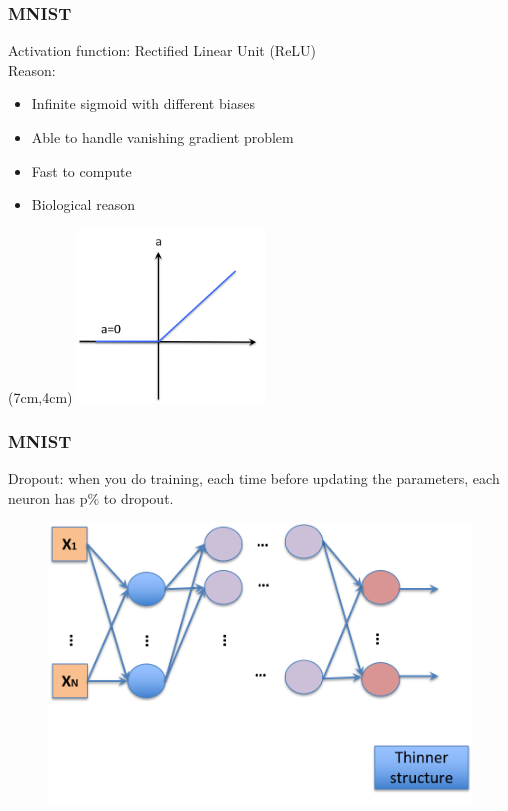 \documentclass{beamer}
\begin{document}
\begin{frame}
	\frametitle{MNIST}
Activation function: Rectified Linear Unit (ReLU)\\
Reason:
\begin{itemize}
		\item Infinite sigmoid with different biases
		\item Able to handle vanishing gradient problem
	\item Fast to compute
	\item Biological reason
\end{itemize}
\vspace{1.5in}

\begin{textblock*}{5cm}(7cm,4cm) %
	\includegraphics[width=5cm]{Picture15}
\end{textblock*}
\end{frame}

\begin{frame}
	\frametitle{MNIST}
Dropout: when you do training, each time before updating the parameters, each neuron has p\% to dropout.
	\begin{figure}
		\includegraphics[width=0.8\linewidth]{Picture16}
	\end{figure}
\end{frame}
\end{document}
